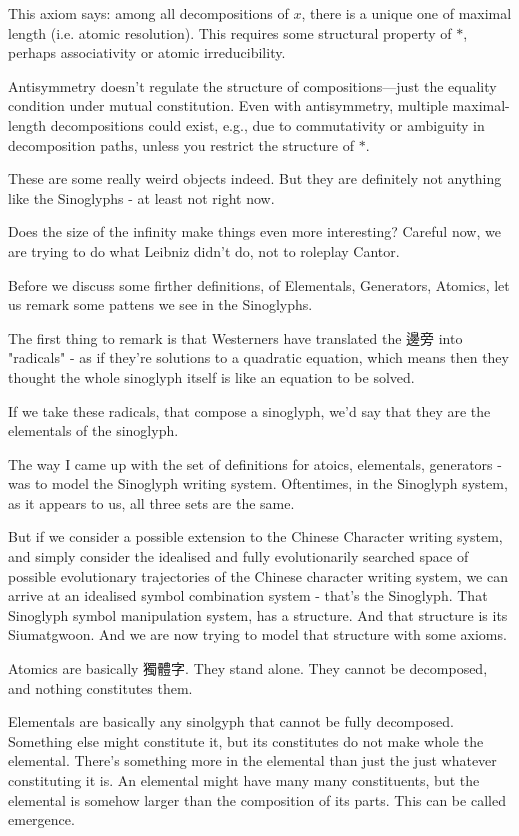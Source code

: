 This axiom says: among all decompositions of $x$, there is a unique one of maximal length (i.e. atomic resolution). This requires some structural property of $*$, perhaps associativity or atomic irreducibility.

Antisymmetry doesn't regulate the structure of compositions—just the equality condition under mutual constitution. Even with antisymmetry, multiple maximal-length decompositions could exist, e.g., due to commutativity or ambiguity in decomposition paths, unless you restrict the structure of $*$.

These are some really weird objects indeed. But they are definitely not anything like the Sinoglyphs - at least not right now. 


Does the size of the infinity make things even more interesting? Careful now, we are trying to do what Leibniz didn't do, not to roleplay Cantor. 

Before we discuss some firther definitions, of Elementals, Generators, Atomics, let us remark some pattens we see in the Sinoglyphs. 

The first thing to remark is that Westerners have translated the 邊旁 into "radicals" - as if they're solutions to a quadratic equation, which means then they thought the whole sinoglyph itself is like an equation to be solved. 

If we take these radicals, that compose a sinoglyph, we'd say that they are the elementals of the sinoglyph. 

The way I came up with the set of definitions for atoics, elementals, generators - was to model the Sinoglyph writing system. Oftentimes, in the Sinoglyph system, as it appears to us, all three sets are the same. 

But if we consider a possible extension to the Chinese Character writing system, and simply consider the idealised and fully evolutionarily searched space of possible evolutionary trajectories of the Chinese character writing system, we can arrive at an idealised symbol combination system - that's the Sinoglyph. That Sinoglyph symbol manipulation system, has a structure. And that structure is its Siumatgwoon. And we are now trying to model that structure with some axioms. 

Atomics are basically 獨體字. They stand alone. They cannot be decomposed, and nothing constitutes them. 

Elementals are basically any sinolgyph that cannot be fully decomposed. Something else might constitute it, but its constitutes do not make whole the elemental. There's something more in the elemental than just the just whatever constituting it is. An elemental might have many many constituents, but the elemental is somehow larger than the composition of its parts. This can be called emergence. 

